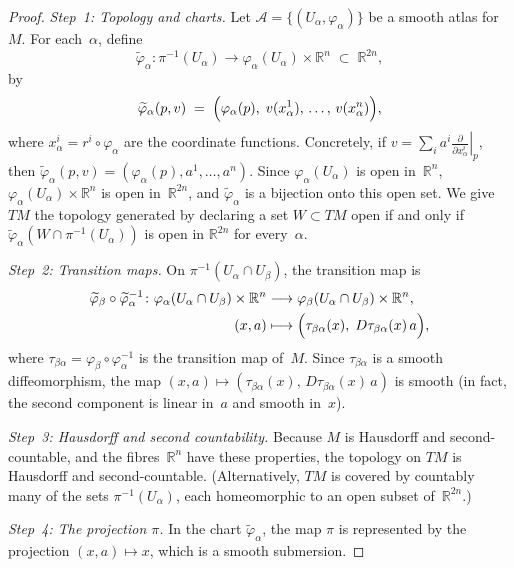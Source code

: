 \documentclass[12pt,a4paper,openany]{book}
\theoremstyle{definition}
\theoremstyle{remark}
\newcommand{\R}{\mathbb{R}}
\begin{document}
\begin{proof}
\emph{Step~1: Topology and charts.}
Let $\mathcal{A} = \{(U_\alpha, \varphi_\alpha)\}$ be a smooth atlas
for~$M$.  For each~$\alpha$, define
\[
  \widetilde{\varphi}_\alpha \colon \pi^{-1}(U_\alpha)
  \longrightarrow \varphi_\alpha(U_\alpha) \times \R^n
  \;\subset\; \R^{2n},
\]
by
\[
  \widetilde{\varphi}_\alpha(p, v)
  \;=\;
  \Bigl(\varphi_\alpha(p),\;
  v(x^1_\alpha),\, \dots,\, v(x^n_\alpha)\Bigr),
\]
where $x^i_\alpha = r^i \circ \varphi_\alpha$ are the coordinate functions.
Concretely, if $v = \sum_i a^i \left.\frac{\partial}{\partial
x^i_\alpha}\right|_p$, then
$\widetilde{\varphi}_\alpha(p,v) = (\varphi_\alpha(p), a^1, \dots, a^n)$.
Since $\varphi_\alpha(U_\alpha)$ is open in~$\R^n$,
$\varphi_\alpha(U_\alpha) \times \R^n$ is open in~$\R^{2n}$, and
$\widetilde{\varphi}_\alpha$ is a bijection onto this open set.
We give $TM$ the topology generated by declaring a set
$W \subset TM$ open if and only if
$\widetilde{\varphi}_\alpha(W \cap \pi^{-1}(U_\alpha))$ is open in
$\R^{2n}$ for every~$\alpha$.

\emph{Step~2: Transition maps.}
On $\pi^{-1}(U_\alpha \cap U_\beta)$, the transition map is
\begin{align*}
  \widetilde{\varphi}_\beta \circ \widetilde{\varphi}_\alpha^{-1}
  \colon
  \varphi_\alpha(U_\alpha \cap U_\beta) \times \R^n
  &\longrightarrow
  \varphi_\beta(U_\alpha \cap U_\beta) \times \R^n, \\
  (x, a) &\longmapsto
  \Bigl(\tau_{\beta\alpha}(x),\;
  D\tau_{\beta\alpha}(x)\, a\Bigr),
\end{align*}
where $\tau_{\beta\alpha} = \varphi_\beta \circ \varphi_\alpha^{-1}$ is
the transition map of~$M$.  Since $\tau_{\beta\alpha}$ is a smooth
diffeomorphism, the map $(x, a) \mapsto (\tau_{\beta\alpha}(x),\,
D\tau_{\beta\alpha}(x)\, a)$ is smooth (in fact, the second component
is linear in~$a$ and smooth in~$x$).

\emph{Step~3: Hausdorff and second countability.}
Because $M$ is Hausdorff and second-countable, and the fibres~$\R^n$ have
these properties, the topology on $TM$ is Hausdorff and second-countable.
(Alternatively, $TM$ is covered by countably many of the sets
$\pi^{-1}(U_\alpha)$, each homeomorphic to an open subset of~$\R^{2n}$.)

\emph{Step~4: The projection $\pi$.}
In the chart $\widetilde{\varphi}_\alpha$, the map $\pi$ is represented by
the projection $(x, a) \mapsto x$, which is a smooth submersion.
\end{proof}
\end{document}
